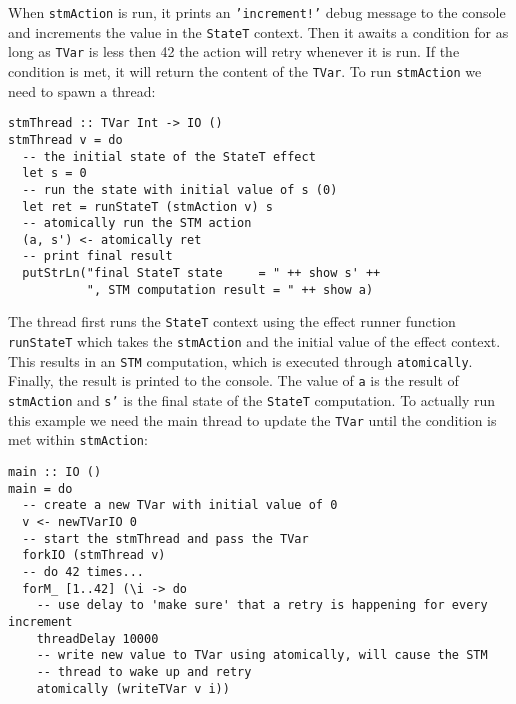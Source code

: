 \medskip %

When \texttt{stmAction} is run, it prints an \texttt{'increment!'} debug message to the console and increments the value in the \texttt{StateT} context. Then it awaits a condition for as long as \texttt{TVar} is less then 42 the action will retry whenever it is run. If the condition is met, it will return the content of the \texttt{TVar}. To run \texttt{stmAction} we need to spawn a thread: \\ %

\begin{footnotesize}
\begin{verbatim}
stmThread :: TVar Int -> IO ()
stmThread v = do
  -- the initial state of the StateT effect
  let s = 0
  -- run the state with initial value of s (0)
  let ret = runStateT (stmAction v) s
  -- atomically run the STM action
  (a, s') <- atomically ret
  -- print final result
  putStrLn("final StateT state     = " ++ show s' ++
           ", STM computation result = " ++ show a)
\end{verbatim}
\end{footnotesize}

\medskip %

The thread first runs the \texttt{StateT} context using the effect runner function \texttt{runStateT} which takes the \texttt{stmAction} and the initial value of the effect context. This results in an \texttt{STM} computation, which is executed through \texttt{atomically}. Finally, the result is printed to the console. The value of \texttt{a} is the result of \texttt{stmAction} and \texttt{s'} is the final state of the \texttt{StateT} computation. To actually run this example we need the main thread to update the \texttt{TVar} until the condition is met within \texttt{stmAction}: \\ %

\begin{footnotesize}
\begin{verbatim}
main :: IO ()
main = do
  -- create a new TVar with initial value of 0
  v <- newTVarIO 0 
  -- start the stmThread and pass the TVar
  forkIO (stmThread v)
  -- do 42 times...
  forM_ [1..42] (\i -> do
    -- use delay to 'make sure' that a retry is happening for every increment
    threadDelay 10000
    -- write new value to TVar using atomically, will cause the STM
    -- thread to wake up and retry
    atomically (writeTVar v i))
\end{verbatim}
\end{footnotesize}

